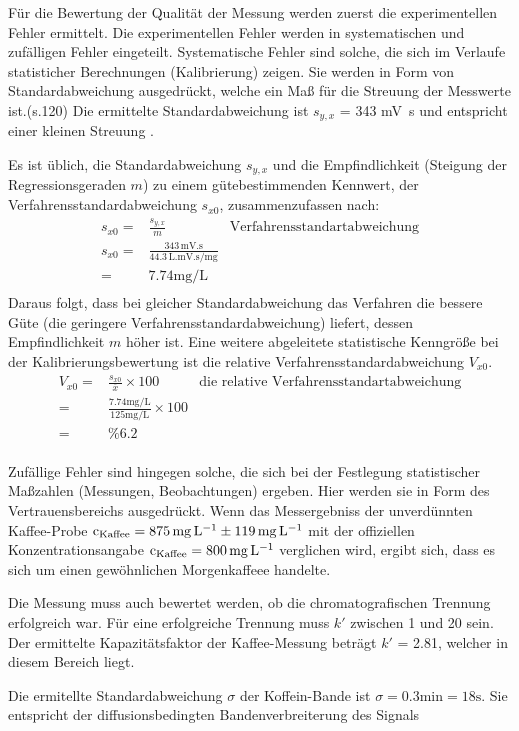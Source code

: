 \documentclass{article}
\begin{document}
%
%

\noindent
{}
Für die Bewertung der Qualität der Messung werden zuerst die experimentellen Fehler ermittelt.
Die experimentellen Fehler werden in systematischen und zufälligen Fehler eingeteilt.
Systematische Fehler sind solche, die sich im Verlaufe statisticher Berechnungen (Kalibrierung) zeigen.
Sie werden in Form von Standardabweichung ausgedrückt, welche ein Maß für die Streuung der Messwerte ist.(s.120)
 Die ermittelte Standardabweichung ist $s_{y,x}$ = 343 \si{\milli\volt.\second} und entspricht einer kleinen Streuung .

 Es ist üblich, die Standardabweichung $s_{y,x}$ und die Empfindlichkeit (Steigung der
Regressionsgeraden $m$) zu einem gütebestimmenden Kennwert, der Verfahrensstandardabweichung
$s_{x0}$, zusammenzufassen nach:
 \begin{align*}
     s_{x0}=&\frac{s_{y,x}}{m} & \text{Verfahrensstandartabweichung} \\
s_{x0}=&\frac{343 \, \si{\milli\volt.\second}}{44.3 \, \si{\liter.\milli\volt.\second\per\milli\gram}}&\\
 =& 7.74 \si{\milli\gram\per\liter}& \\
  \end{align*}
  Daraus folgt, dass bei gleicher Standardabweichung das Verfahren die bessere
Güte (die geringere Verfahrensstandardabweichung) liefert, dessen Empfindlichkeit $m$
höher ist.
  Eine weitere abgeleitete statistische Kenngröße bei der Kalibrierungsbewertung ist
die relative Verfahrensstandardabweichung $V_{x0}$.
  \begin{align*}
 V_{x0}=&\frac{s_{x0}}{\overline{x}}\times 100 &\text{die relative Verfahrensstandartabweichung}\\
 = &\frac{7.74 \si{\milli\gram\per\liter}}{125 \si{\milli\gram\per\liter}}\times 100 & \\
 =& \%6.2 &\\
   \end{align*}



Zufällige Fehler sind hingegen solche, die sich bei der Festlegung statistischer Maßzahlen (Messungen, Beobachtungen) ergeben.
Hier werden sie in Form des Vertrauensbereichs ausgedrückt.
Wenn das Messergebniss der unverdünnten Kaffee-Probe
$\ce{c_{Kaffee}} = 875 \, \si{\milli\gram\per\liter} \pm 119  \, \si{\milli\gram\per\liter}$
 mit der \glqq offiziellen \grqq ~\cite{koffeincom} Konzentrationsangabe $\ce{c_{Kaffee}} = 800 \, \si{\milli\gram\per\liter}$ verglichen wird,
  ergibt sich, dass es sich um einen gewöhnlichen Morgenkaffeee handelte.

 Die Messung muss auch bewertet werden, ob die chromatografischen Trennung erfolgreich war.
 Für eine erfolgreiche Trennung muss $k'$ zwischen 1 und 20 sein.~\cite{harris}
 Der ermittelte Kapazitätsfaktor der Kaffee-Messung beträgt $k'$ = 2.81, welcher in diesem Bereich liegt.


  Die ermitellte Standardabweichung $\sigma$ der Koffein-Bande ist $\sigma = 0.3 \si{\minute} = 18 \si{\second}$.
  Sie entspricht der diffusionsbedingten Bandenverbreiterung des Signals~\cite{harris}

\printbibliography
\end{document}
